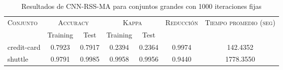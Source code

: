 \begin{table}[]
\centering
\begin{tabular}{l c c c c c c}
\hline
\multirow{2}{*}{\textsc{Conjunto}}
	& \multicolumn{2}{c}{\textsc{Accuracy}}
	& \multicolumn{2}{c}{\textsc{Kappa}}
	& \textsc{Reducción}
	& \textsc{Tiempo promedio (seg)} \\
	& Training & Test
	& Training & Test \\ 
\hline
\hline

credit-card & 0.7923 & 0.7917 & 0.2394 & 0.2364 & 0.9974 & 142.4352 \\
shuttle & 0.9791 & 0.9985 & 0.9958 & 0.9956 & 0.9440 & 1778.3550 \\

\hline
\end{tabular}
\caption{Resultados de CNN-RSS-MA para conjuntos grandes con 1000 iteraciones fijas}
\label{res-grande-CNN-RSS-MA}
\end{table}

